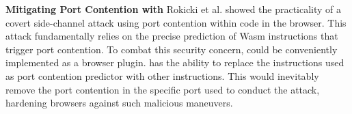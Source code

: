 \textbf{Mitigating Port Contention with \tool} 
Rokicki et al. \cite{10.1145/3488932.3517411} showed the practicality of a covert side-channel attack using port contention within \Wasm code in the browser. This attack fundamentally relies on the precise prediction of Wasm instructions that trigger port contention.
To combat this security concern, \tool could be conveniently implemented as a browser plugin. 
\tool has the ability to replace the \wasm instructions used as port contention predictor with other instructions.
This would inevitably remove the port contention in the specific port used to conduct the attack, hardening browsers against such malicious maneuvers.





